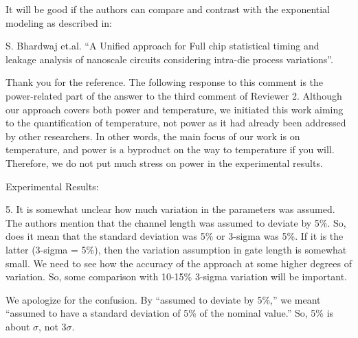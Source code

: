 \begin{reviewer}
It will be good if the authors can compare and contrast with the exponential modeling as described in:

S. Bhardwaj et.al. ``A Unified approach for Full chip statistical timing and leakage analysis of nanoscale circuits considering intra-die process variations''.
\end{reviewer}
\begin{authors}
Thank you for the reference.
The following response to this comment is the power-related part of the answer to the third comment of Reviewer 2.
Although our approach covers both power and temperature, we initiated this work aiming to the quantification of temperature, not power as it had already been addressed by other researchers.
In other words, the main focus of our work is on temperature, and power is a byproduct on the way to temperature if you will.
Therefore, we do not put much stress on power in the experimental results.


\end{authors}

\begin{reviewer}
Experimental Results:

5. It is somewhat unclear how much variation in the parameters was assumed. The authors mention that the channel length was assumed to deviate by 5\%. So, does it mean that the standard deviation was 5\% or 3-sigma was 5\%. If it is the latter (3-sigma = 5\%), then the variation assumption in gate length is somewhat small. We need to see how the accuracy of the approach at some higher degrees of variation. So, some comparison with 10-15\% 3-sigma variation will be important.
\end{reviewer}
\begin{authors}
We apologize for the confusion.
By ``assumed to deviate by 5\%,'' we meant ``assumed to have a standard deviation of 5\% of the nominal value.''
So, 5\% is about $\sigma$, not $3 \sigma$.

\end{authors}

